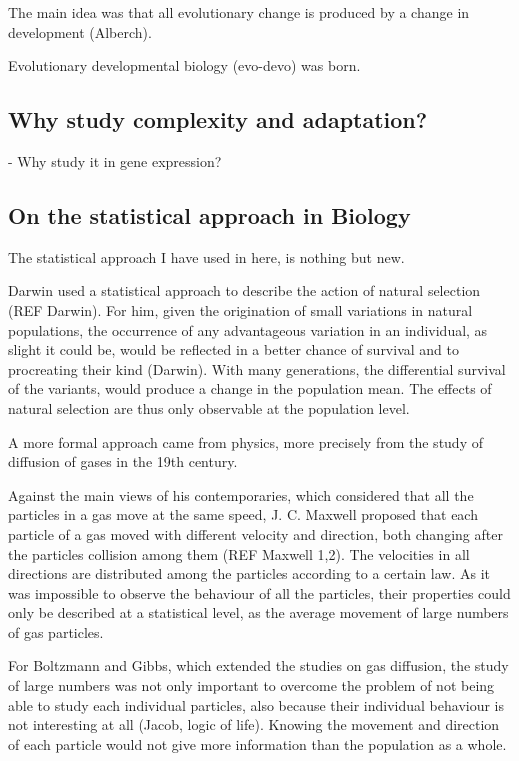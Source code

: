 The main idea was that all evolutionary change is produced by a change in development (Alberch).

Evolutionary developmental biology (evo-devo) was born.



\subsection{Why study complexity and adaptation?}

- Why study it in gene expression?

\subsection{On the statistical approach in Biology}
The statistical approach I have used in here, is nothing but new.

Darwin used a statistical approach to describe the action of natural selection (REF Darwin). For him, given the origination of small variations in natural populations, the occurrence of any advantageous variation in an individual, as slight it could be, would be reflected in a better chance of survival and to procreating their kind (Darwin). With many generations, the differential survival of the variants, would produce a change in the population mean. 
The effects of natural selection are thus only observable at the population level.

A more formal approach came from physics, more precisely from the study of diffusion of gases in the 19th century.

Against the main views of his contemporaries, which considered that all the particles in a gas move at the same speed, J. C. Maxwell proposed that each particle of a gas moved with different velocity and direction, both changing after the particles collision among them (REF Maxwell 1,2).
The velocities in all directions are distributed among the particles according to a certain law. As it was impossible to observe the behaviour of all the particles, their properties could only be described at a statistical level, as the average movement of large numbers of gas particles.

For Boltzmann and Gibbs, which extended the studies on gas diffusion, the study of large numbers was not only important to overcome the problem of not being able to study each individual particles, also because their individual behaviour is not interesting at all (Jacob, logic of life). Knowing the movement and direction of each particle would not give more information than the population as a whole.

